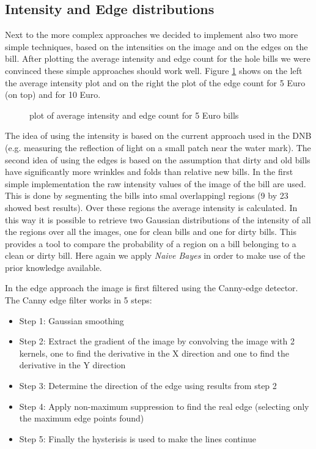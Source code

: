 \documentclass[11pt,twocolumn]{article}
\begin{document}
		\subsection{Intensity and Edge distributions}\label{sec:Intensity_Edge}
			Next to the more complex approaches we decided to implement also two more simple techniques, based on the intensities on the image and on the edges on the bill. After plotting the average intensity and edge count for the hole bills we were convinced these simple approaches should work well. Figure \ref{histograms} shows on the left the average intensity plot and on the right the plot of the edge count for 5 Euro (on top) and for 10 Euro.

			\begin{figure}[!hbtp]
				\centering
				\caption{plot of average intensity and edge count for 5 Euro bills}
				\label{histograms}
			\end{figure}


The idea of using the intensity is based on	the current approach used in the DNB (e.g. measuring the reflection of light on a small patch near the water mark). The second idea of using the edges is based on the assumption that dirty and old bills have significantly more wrinkles and folds than relative new bills. In the first simple implementation the raw intensity values of the image of the bill are used. This is done by segmenting the bills into smal overlappingl regions (9 by 23 showed best results). Over these regions the average intensity is calculated. In this way it is possible to retrieve two Gaussian distributions of the intensity of all the regions over all the images, one for clean bills and one for dirty bills. This provides a tool to compare the probability of a region on a bill belonging to a clean or dirty bill. Here again we apply \emph{Naive Bayes} in order to make use of the prior knowledge available.
			
			In the edge approach the image is first filtered using the Canny-edge detector. The Canny edge filter works in 5 steps: 
			
			\begin{itemize} 
				\item Step 1: Gaussian smoothing 
				\item Step 2: Extract the gradient of the image by convolving the image with 2 kernels, one to find the derivative in the X direction and one to find the derivative in the Y direction				
				\item Step 3: Determine the direction of the edge using results from step 2  
				\item Step 4: Apply non-maximum suppression to find the real edge (selecting only the maximum edge points found)
				\item Step 5: Finally the hysterisis is used to make the lines continue
            \end{itemize} 
            
\end{document}
